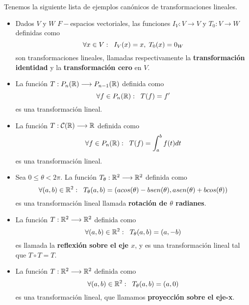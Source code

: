 Tenemos la siguiente lista de ejemplos canónicos de transformaciones
lineales.
\begin{itemize}
	\item Dados $V$ y $W$ $F-$espacios vectoriales,
	las funciones $I_{V}: V \longrightarrow V$
	y $T_{0}: V \longrightarrow W$ definidas como
	\[
	\forall x \in V : \hspace{0.2cm}
	I_{V}(x) = x, \hspace{0.1cm}
	T_{0}(x) = 0_{W}
	\]
	son transformaciones lineales, llamadas respectivamente
	la \textbf{transformación identidad} y 
	la \textbf{transformación cero} en $V$.
	\item La función
	$T: P_{n}(\mathbb{R}) \longrightarrow P_{n-1}(\mathbb{R})$
	definida como
	\[
	\forall f \in P_{n}(\mathbb{R}) : \hspace{0.2cm}
	T(f) = f'
	\]
	es una transformación lineal.
	\item La función
	$T: \mathcal{C}(\mathbb{R}) \longrightarrow \mathbb{R}$
	definida como
	\[
	\forall f \in P_{n}(\mathbb{R}) : \hspace{0.2cm}
	T(f) = \int_{a}^{b} f(t)dt
	\]
	es una transformación lineal.
	\item Sea $0 \leq \theta < 2 \pi$. La función
	$T_{\theta} : \mathbb{R}^{2} \longrightarrow \mathbb{R}^{2}$ definida como 
	\[
	\forall (a, b) \in \mathbb{R}^{2} : \hspace{0.2cm}
	T_{\theta}(a, b) = (a cos(\theta) - b sen(\theta), 
	a sen(\theta) + b cos(\theta))
	\]
	es una transformación lineal llamada 
	\textbf{rotación de $\theta$ radianes}.
	\item La función $T:\mathbb{R}^{2} \longrightarrow \mathbb{R}^{2}$ definida como
	\[
	\forall (a, b) \in \mathbb{R}^{2} : \hspace{0.2cm}
	T_{\theta}(a, b) = (a, -b)
	\]
	es llamada la \textbf{reflexión sobre el eje $x$}, y es una 
	transformación lineal tal que $T \circ T = T$.
	\item La función $T:\mathbb{R}^{2} \longrightarrow \mathbb{R}^{2}$ definida como
	\[
	\forall (a, b) \in \mathbb{R}^{2} : \hspace{0.2cm}
	T_{\theta}(a, b) = (a, 0)
	\]
	es una transformación lineal, que llamamos \textbf{proyección
	sobre el eje-x}.
\end{itemize}



